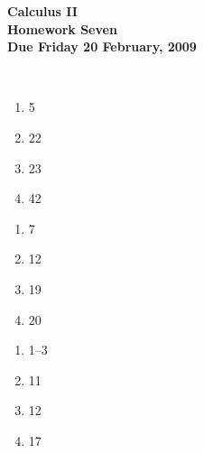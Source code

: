 \documentclass[12pt]{article}
\begin{document}
\pagestyle{empty}
 
\begin{center}
{\large {\bf Calculus II}}\\
\medskip
{\large {\bf Homework Seven}}\\
\medskip
{ {\bf Due Friday 20 February, 2009}}\\
\end{center}

\hspace{2mm}\\
   


\begin{enumerate}
\setlength{\itemsep}{-1mm}
  \item 5
  \item 22
  \item 23
  \item 42
\end{enumerate}


\begin{enumerate}
\setlength{\itemsep}{-1mm}
  \item 7
  \item 12
  \item 19
  \item 20
\end{enumerate}



\begin{enumerate}
\setlength{\itemsep}{-1mm}
  \item 1--3
  \item 11
  \item 12
  \item 17
\end{enumerate}
\end{document}
